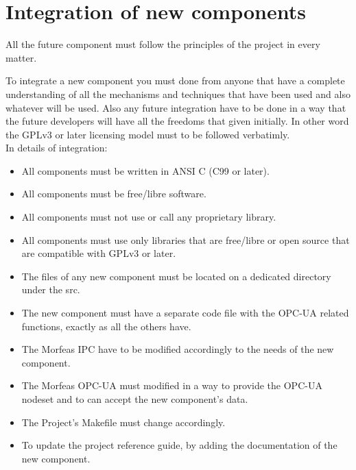 \newpage
\section{Integration of new components}
All the future component must follow the principles of the project in every matter.

To integrate a new component you must done from anyone that have a complete understanding of all the mechanisms and techniques that have been used and also whatever will be used.
Also any future integration have to be done in a way that the future developers will have all the freedoms that given initially.
In other word the GPLv3 or later licensing model must to be followed verbatimly.\\

In details of integration:
\begin{itemize}
	\item All components must be written in ANSI C (C99 or later).
	\item All components must be free/libre software.
	\item All components must not use or call any proprietary library.
	\item All components must use only libraries that are free/libre or open source that are compatible with GPLv3 or later.
	\item The files of any new component must be located on a dedicated directory under the src.
	\item The new component must have a separate code file with the OPC-UA related functions, exactly as all the others have.
	\item The Morfeas IPC have to be modified accordingly to the needs of the new component.
	\item The Morfeas OPC-UA must modified in a way to provide the OPC-UA nodeset and to can accept the new component's data.
	\item The Project's Makefile must change accordingly.
	\item To update the project reference guide, by adding the documentation of the new component.
\end{itemize}
